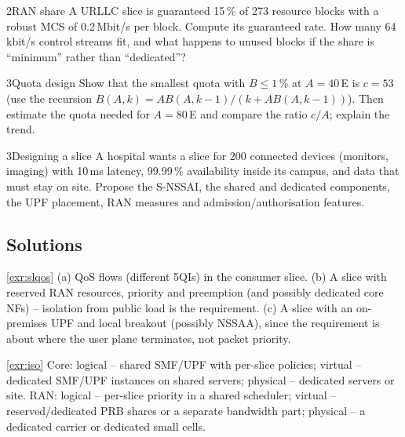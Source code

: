 \documentclass[11pt,a4paper]{article}
\begin{document}
\begin{exercisebox}{2}{RAN share}\label{exr:prb}
A URLLC slice is guaranteed 15\,\% of 273 resource blocks with a robust MCS of 0.2\,Mbit/s per block. Compute its guaranteed rate. How many 64\,kbit/s
control streams fit, and what happens to unused blocks if the share is ``minimum'' rather than ``dedicated''?
\end{exercisebox}

\begin{exercisebox}{3}{Quota design}\label{exr:nsac}
Show that the smallest quota with $B \le 1\,\%$ at $A = 40$\,E is $c = 53$ (use the recursion $B(A,k) = A B(A,k-1)/(k + A B(A,k-1))$). Then estimate the quota
needed for $A = 80$\,E and compare the ratio $c/A$; explain the trend.
\end{exercisebox}

\begin{exercisebox}{3}{Designing a slice}\label{exr:design}
A hospital wants a slice for 200 connected devices (monitors, imaging) with 10\,ms latency, 99.99\,\% availability inside its campus, and data that must
stay on site. Propose the S-NSSAI, the shared and dedicated components, the UPF placement, RAN measures and admission/authorisation features.
\end{exercisebox}

\subsection*{Solutions}

\begin{solutionbox}{\ref{exr:slqos}}
(a) QoS flows (different 5QIs) in the consumer slice. (b) A slice with reserved RAN resources, priority and preemption (and possibly dedicated core NFs)
-- isolation from public load is the requirement. (c) A slice with an on-premises UPF and local breakout (possibly NSSAA), since the requirement is about
where the user plane terminates, not packet priority.
\end{solutionbox}

\begin{solutionbox}{\ref{exr:iso}}
Core: logical -- shared SMF/UPF with per-slice policies; virtual -- dedicated SMF/UPF instances on shared servers; physical -- dedicated servers or site.
RAN: logical -- per-slice priority in a shared scheduler; virtual -- reserved/dedicated PRB shares or a separate bandwidth part; physical -- a dedicated
carrier or dedicated small cells.
\end{solutionbox}
\end{document}
